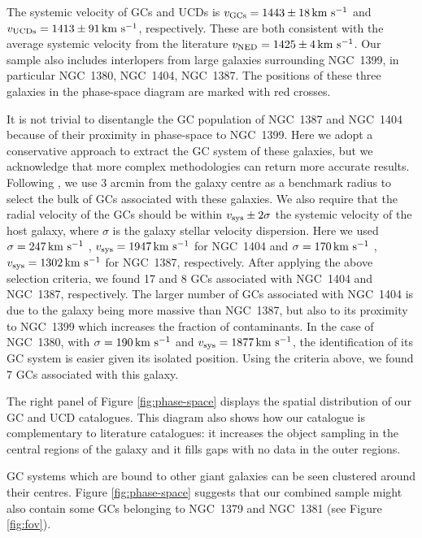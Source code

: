 \documentclass[useAMS,usenatbib]{mn2e}
\newcommand{\kms}{\mbox{\,km~s$^{-1}$}}
\begin{document}
The systemic velocity of GCs and UCDs is $v_{\rm GCs} = 1443 \pm 18 \kms$ and 
$v_{\rm UCDs} = 1413 \pm 91 \kms$, respectively. These are both consistent with 
the average systemic velocity from the literature $v_{\rm NED} = 1425 \pm 4 
\kms$. Our sample also includes interlopers from large galaxies surrounding 
NGC~1399, in particular NGC~1380, NGC~1404, NGC~1387. The positions of these 
three galaxies in the phase-space diagram are marked with red crosses. 

It is not trivial to disentangle the GC population of NGC~1387 and NGC~1404 
because of their proximity in phase-space to NGC~1399. 
Here we adopt a conservative approach to extract the GC system of these 
galaxies, but we acknowledge that more complex methodologies can return more 
accurate results. Following \citet{Schuberth}, we use 3 arcmin from the galaxy 
centre as a benchmark radius to select the bulk of GCs associated with these 
galaxies. We also require that the radial velocity of the GCs should be within 
$v_{\rm sys} \pm 2\sigma$  the systemic velocity of the host galaxy, where 
$\sigma$ is the galaxy stellar velocity dispersion. Here we used $\sigma = 247 
\kms$  \citep{Vanderbeke11}, $v_{\rm sys} = 1947 \kms$ for NGC~1404 and $\sigma 
= 170 \kms$ \citep{Wegner03}, $v_{\rm sys} = 1302\kms $ for NGC~1387, 
respectively. After applying the above selection criteria, we found 17 and 8 
GCs associated with NGC~1404 and NGC~1387, respectively. The larger number of 
GCs associated with NGC~1404 is due to the galaxy being more massive than 
NGC~1387, but also to its proximity to NGC~1399 which increases the fraction of 
contaminants.
In the case of NGC~1380, with $\sigma = 190 \kms$  \citep{Vanderbeke11} and 
$v_{\rm sys} = 1877 \kms$, the identification of its GC system is easier given 
its isolated position. Using the criteria above, we found 7 GCs associated with 
this galaxy. 

The right panel of Figure \ref{fig:phase-space} displays the spatial 
distribution of our GC and UCD catalogues. This diagram also shows how our 
catalogue is complementary to literature catalogues: it increases the object 
sampling in the central regions of the galaxy and it fills gaps with no data in 
the outer regions. 

GC systems which are bound to other giant galaxies can be seen clustered around 
their centres. Figure \ref{fig:phase-space} suggests that our combined sample 
might also contain some GCs belonging to NGC~1379 and NGC~1381 (see Figure 
\ref{fig:fov}). 
\end{document}
